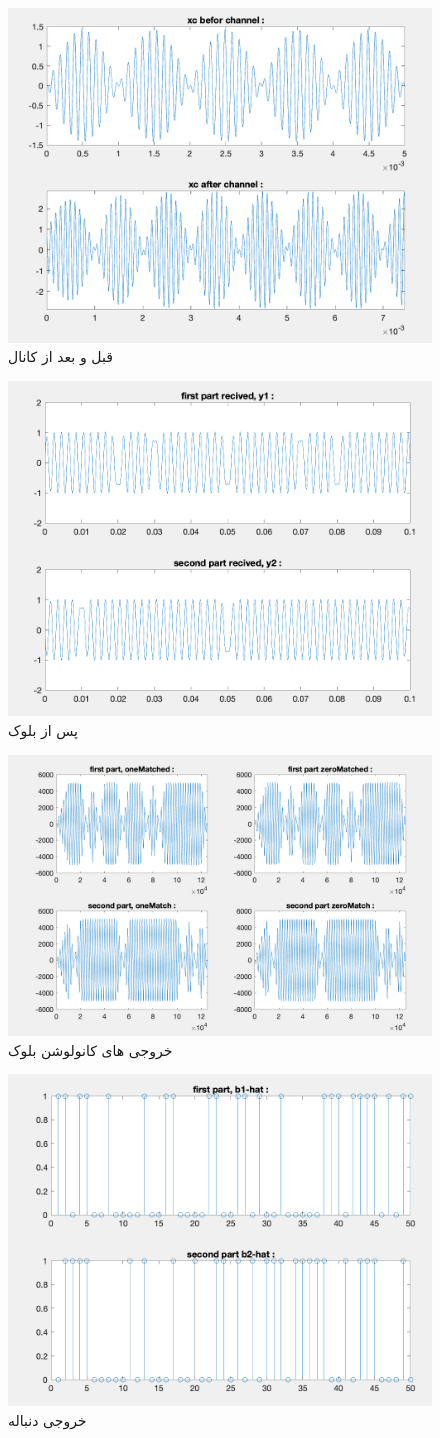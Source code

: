 \documentclass[10pt]{article}
\begin{document}
	\begin{figure}[h]
		\centering
		\includegraphics[width=0.5\linewidth]{../img/3.2.4}
		\caption{قبل و بعد از کانال}
		\label{fig:3-2-4}
	\end{figure}
	
	\newpage
	\begin{figure}[H]
		\centering
		\includegraphics[width=0.5\linewidth]{../img/3.2.5}
		\caption{پس از بلوک 
			}
		\label{fig:3-2-5}
	\end{figure}
	
	
	\begin{figure}[h]
		\centering
		\includegraphics[width=0.6\linewidth]{../img/3.2.6}
		\caption{خروجی های کانولوشن بلوک 
			}
		\label{fig:3-2-6}
	\end{figure}
	
	\begin{figure}[h]
		\centering
		\includegraphics[width=0.5\linewidth]{../img/3.2.7}
		\caption{خروجی دنباله 
			}
		\label{fig:3-2-7}
	\end{figure}
	
\end{document}
